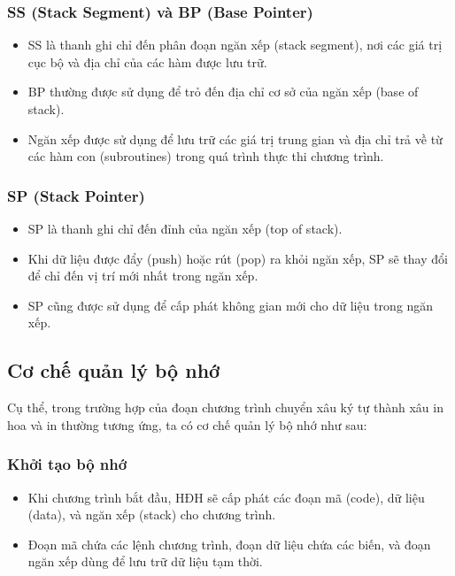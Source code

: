 \subsubsection{SS (Stack Segment) và BP (Base Pointer)}
\begin{itemize}
    \item SS là thanh ghi chỉ đến phân đoạn ngăn xếp (stack segment), nơi các giá trị cục bộ và địa chỉ của các hàm được lưu trữ.
    \item BP thường được sử dụng để trỏ đến địa chỉ cơ sở của ngăn xếp (base of stack).
    \item Ngăn xếp được sử dụng để lưu trữ các giá trị trung gian và địa chỉ trả về từ các hàm con (subroutines) trong quá trình thực thi chương trình.
\end{itemize}

\subsubsection{SP (Stack Pointer)}
\begin{itemize}
    \item SP là thanh ghi chỉ đến đỉnh của ngăn xếp (top of stack).
    \item Khi dữ liệu được đẩy (push) hoặc rút (pop) ra khỏi ngăn xếp, SP sẽ thay đổi để chỉ đến vị trí mới nhất trong ngăn xếp.
    \item SP cũng được sử dụng để cấp phát không gian mới cho dữ liệu trong ngăn xếp.
\end{itemize}

\subsection{Cơ chế quản lý bộ nhớ}

Cụ thể, trong trường hợp của đoạn chương trình chuyển xâu ký tự thành xâu in hoa và in thường tương ứng, ta có cơ chế quản lý bộ nhớ như sau:

\subsubsection{Khởi tạo bộ nhớ}
\begin{itemize}
    \item Khi chương trình bắt đầu, HĐH sẽ cấp phát các đoạn mã (code), dữ liệu (data), và ngăn xếp (stack) cho chương trình.
    \item Đoạn mã chứa các lệnh chương trình, đoạn dữ liệu chứa các biến, và đoạn ngăn xếp dùng để lưu trữ dữ liệu tạm thời.
\end{itemize}

